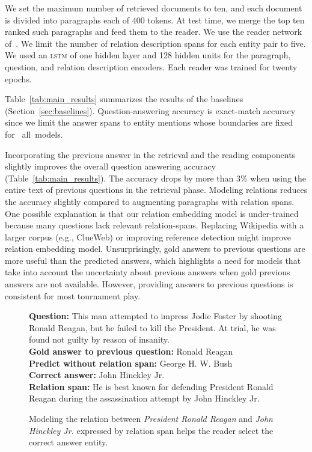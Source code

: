 We set the maximum number of retrieved documents to ten, and
each document is divided into paragraphs each of 400 tokens. At test time, 
we merge the top ten ranked such paragraphs and feed them to the reader.
We use the reader network of~. 
We limit the number of relation description spans for each entity pair to
five. We used an \textsc{lstm} of
one hidden layer and 128 hidden units for the paragraph, question, and 
relation description encoders. Each reader was trained for twenty epochs.

Table~\ref{tab:main_results} summarizes the results of the baselines
(Section~\ref{sec:baselines}).  Question-answering accuracy is
exact-match accuracy since we limit the answer spans to entity
mentions whose boundaries are fixed for~ all~models.


Incorporating the previous answer in the retrieval and the reading
components slightly improves the overall question answering accuracy
(Table~\ref{tab:main_results}).  The accuracy drops by more than 3\%
when using the entire text of previous questions in the retrieval
phase.  Modeling relations reduces the accuracy slightly compared to
augmenting paragraphs with relation spans.  One possible explanation
is that our relation embedding model is under-trained because many
questions lack relevant relation-spans. Replacing Wikipedia with a
larger corpus (e.g., ClueWeb) or improving reference detection might
improve relation embedding model.
Unsurprisingly, gold answers to previous questions are more useful
than the predicted answers, which highlights a need for models that
take into account the uncertainty about previous answers when gold
previous answers are not available.  However, providing answers to
previous questions is consistent for most \qb{} tournament play.





\begin{figure}[t!]
\begin{framed}
\small
\textbf{Question:} This man attempted to impress Jodie Foster by shooting Ronald Reagan, but he failed to kill the President. At trial, he was found not guilty by reason of insanity.\\
\textbf{Gold answer to previous question:} Ronald Reagan \\
\textbf{Predict without relation span:} George H. W. Bush\\
\textbf{Correct answer:} John Hinckley Jr.\\
\textbf{Relation span:} He is best known for defending President Ronald Reagan during the assassination attempt by John Hinckley Jr.
\label{framed:example2}
\end{framed}
\caption{Modeling the relation between \textit{President Ronald Reagan}
and \textit{John Hinckley Jr.} expressed by relation span helps 
the reader select the correct answer entity.}


\label{fig:example2}
\end{figure}


